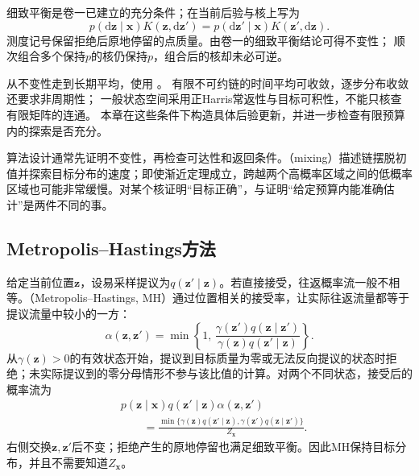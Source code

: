 细致平衡是卷一已建立的充分条件；在当前后验与核上写为
\begin{equation}
  p(\mathrm{d}\bm{z}\mid\bm{x})K(\bm{z},\mathrm{d}\bm{z}')
    =p(\mathrm{d}\bm{z}'\mid\bm{x})K(\bm{z}',\mathrm{d}\bm{z}).
  \label{eq:pgm-sampling-detailed-balance}
\end{equation}
测度记号保留拒绝后原地停留的点质量。由卷一的细致平衡结论可得不变性；
顺次组合多个保持$p$的核仍保持$p$，组合后的核却未必可逆。

从不变性走到长期平均，使用
。
有限不可约链的时间平均可收敛，逐步分布收敛还要求非周期性；
一般状态空间采用正Harris常返性与目标可积性，不能只核查有限矩阵的连通。
本章在这些条件下构造具体后验更新，并进一步检查有限预算内的探索是否充分。

算法设计通常先证明不变性，再检查可达性和返回条件。（mixing）描述链摆脱初值并探索目标分布的速度；即使渐近定理成立，跨越两个高概率区域之间的低概率区域也可能非常缓慢。对某个核证明“目标正确”，与证明“给定预算内能准确估计”是两件不同的事。

\subsection{Metropolis--Hastings方法}
\label{sec:pgm-sampling-mh}

给定当前位置$\bm{z}$，设易采样提议为$q(\bm{z}'\mid\bm{z})$。若直接接受，往返概率流一般不相等。（Metropolis--Hastings, MH）通过位置相关的接受率，让实际往返流量都等于提议流量中较小的一方：
\begin{equation}
  \alpha(\bm{z},\bm{z}')
    =\min\left\{1,\,
      \frac{\gamma(\bm{z}')q(\bm{z}\mid\bm{z}')}
           {\gamma(\bm{z})q(\bm{z}'\mid\bm{z})}\right\}.
  \label{eq:pgm-sampling-mh-acceptance}
\end{equation}
从$\gamma(\bm{z})>0$的有效状态开始，提议到目标质量为零或无法反向提议的状态时拒绝；未实际提议到的零分母情形不参与该比值的计算。对两个不同状态，接受后的概率流为
\[
  \begin{aligned}
    &p(\bm{z}\mid\bm{x})q(\bm{z}'\mid\bm{z})\alpha(\bm{z},\bm{z}')\\
    &\qquad=\frac{\min\{\gamma(\bm{z})q(\bm{z}'\mid\bm{z}),
                    \gamma(\bm{z}')q(\bm{z}\mid\bm{z}')\}}
         {Z_{\bm{x}}}.
  \end{aligned}
\]
右侧交换$\bm{z},\bm{z}'$后不变；拒绝产生的原地停留也满足细致平衡。因此MH保持目标分布，并且不需要知道$Z_{\bm{x}}$。

